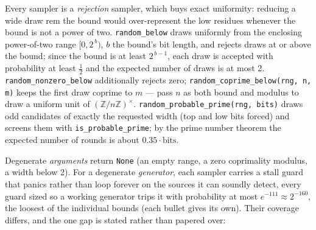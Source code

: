 \documentclass[11pt]{article}
\newcommand{\code}[1]{\texttt{#1}}
\newcommand{\Z}{\mathbb{Z}}
\begin{document}
Every sampler is a \emph{rejection} sampler, which buys exact uniformity:
reducing a wide draw rem the bound would over-represent the low
residues whenever the bound is not a power of two. \code{random\_below}
draws uniformly from the enclosing power-of-two range $[0, 2^{\,b})$, $b$
the bound's bit length, and rejects draws at or above the bound; since the
bound is at least $2^{\,b-1}$, each draw is accepted with probability at
least $\tfrac12$ and the expected number of draws is at most 2.
\code{random\_nonzero\_below} additionally rejects zero;
\code{random\_coprime\_below(rng, n, m)} keeps the first draw coprime to
$m$ --- pass $n$ as both bound and modulus to draw a uniform unit of
$(\Z/n\Z)^{\times}$. \code{random\_probable\_prime(rng, bits)} draws odd
candidates of exactly the requested width (top and low bits forced) and
screens them with \code{is\_probable\_prime}; by the prime number theorem
the expected number of rounds is about $0.35 \cdot \mathrm{bits}$.

Degenerate \emph{arguments} return \code{None} (an empty range, a zero
coprimality modulus, a width below 2). For a degenerate \emph{generator},
each sampler carries a stall guard that panics rather than loop forever on
the sources it can soundly detect, every guard sized so a working
generator trips it with probability at most $e^{-111} \approx 2^{-160}$,
the loosest of the individual bounds (each bullet gives its own). Their
coverage differs, and the one gap is stated rather than papered over:
\end{document}
